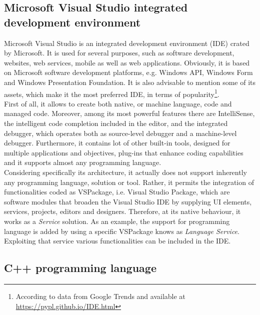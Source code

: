 \subsection{Microsoft Visual Studio integrated development environment}
\label{subsection:visual-studio-env}

Microsoft Visual Studio is an integrated development environment (IDE) crated by Microsoft. 
It is used for several purposes, such as software development, websites, web services, mobile as well as web applications. 
Obviously, it is based on Microsoft software development platforms, e.g. Windows API, Windows Form and Windows Presentation Foundation. 
It is also advisable to mention some of its assets, which make it the most preferred IDE, in terms of popularity\footnote{According to data from Google Trends and available at \url{https://pypl.github.io/IDE.html}}. \\
First of all, it allows to create both native, or machine language, code and managed code.
Moreover, among its most powerful features there are IntelliSense, the intelligent code completion included in the editor, and the integrated debugger, which operates both as source-level debugger and a machine-level debugger. 
Furthermore, it contains lot of other built-in tools, designed for multiple applications and objectives, plug-ins that enhance coding capabilities and it supports almost any programming language.\\
Considering specifically its architecture, it actually does not support inherently any programming language, solution or tool.
Rather, it permits the integration of functionalities coded as VSPackage, i.e. Visual Studio Package, which are software modules that broaden the Visual Studio IDE by supplying UI elements, services, projects, editors and designers. 
Therefore, at its native behaviour, it works as a \textit{Service} solution. 
As an example, the support for programming language is added by using a specific VSPackage knows as \textit{Language Service}.
Exploiting that service various functionalities can be included in the IDE. 

\subsection{C++ programming language}
\label{subsection:c++-env}

